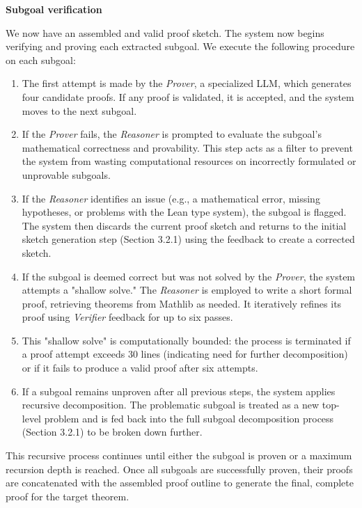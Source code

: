 \documentclass[12pt, letterpaper]{article}
\begin{document}
\textbf{Subgoal verification}

\medskip

We now have an assembled and valid proof sketch. The system now begins verifying and proving each extracted subgoal. We execute the following procedure on each subgoal:
\begin{enumerate}


\item The first attempt is made by the \textit{Prover}, a specialized LLM, which generates four candidate proofs. If any proof is validated, it is accepted, and the system moves to the next subgoal.\citep{varambally2025hilbertrecursivelybuildingformal}

\item[1.] If the \textit{Prover} fails, the \textit{Reasoner} is prompted to evaluate the subgoal's mathematical correctness and provability. This step acts as a filter to prevent the system from wasting computational resources on incorrectly formulated or unprovable subgoals. \citep{varambally2025hilbertrecursivelybuildingformal}

\item If the \textit{Reasoner} identifies an issue (e.g., a mathematical error, missing hypotheses, or problems with the Lean type system), the subgoal is flagged. The system then discards the current proof sketch and returns to the initial sketch generation step (Section 3.2.1) using the feedback to create a corrected sketch. \citep{varambally2025hilbertrecursivelybuildingformal}

\item If the subgoal is deemed correct but was not solved by the \textit{Prover}, the system attempts a "shallow solve." The \textit{Reasoner} is employed to write a short formal proof, retrieving theorems from Mathlib as needed. It iteratively refines its proof using \textit{Verifier} feedback for up to six passes. \citep{varambally2025hilbertrecursivelybuildingformal}

\item This "shallow solve" is computationally bounded: the process is terminated if a proof attempt exceeds 30 lines (indicating need for further decomposition) or if it fails to produce a valid proof after six attempts. \citep{varambally2025hilbertrecursivelybuildingformal}

\item If a subgoal remains unproven after all previous steps, the system applies recursive decomposition. The problematic subgoal is treated as a new top-level problem and is fed back into the full subgoal decomposition process (Section 3.2.1) to be broken down further. \citep{varambally2025hilbertrecursivelybuildingformal}
\end{enumerate}
This recursive process continues until either the subgoal is proven or a maximum recursion depth is reached. Once all subgoals are successfully proven, their proofs are concatenated with the assembled proof outline to generate the final, complete proof for the target theorem.
\end{document}
